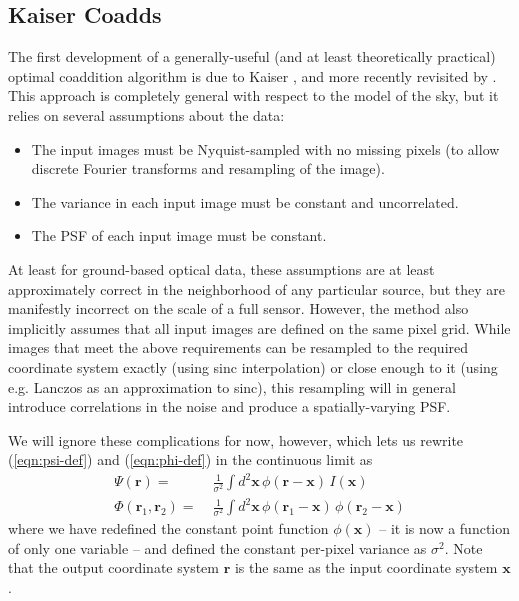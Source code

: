 \documentclass[10pt]{article}
\newcommand{\eqnref}[1]{(\ref{eqn:#1})}
\begin{document}
\subsection{Kaiser Coadds}
\label{sec:kaiser-coadds}

The first development of a generally-useful (and at least theoretically practical) optimal coaddition algorithm is due to Kaiser \citep{Kaiser2001}, and more recently revisited by \cite{2015arXiv151206879Z}.  This approach is completely general with respect to the model of the sky, but it relies on several assumptions about the data:
\begin{itemize}
\item The input images must be Nyquist-sampled with no missing pixels (to allow discrete Fourier transforms and resampling of the image).
\item The variance in each input image must be constant and uncorrelated.
\item The PSF of each input image must be constant.
\end{itemize}
At least for ground-based optical data, these assumptions are at least approximately correct in the neighborhood of any particular source, but they are manifestly incorrect on the scale of a full sensor.  However, the method also implicitly assumes that all input images are defined on the same pixel grid.  While images that meet the above requirements can be resampled to the required coordinate system exactly (using sinc interpolation) or close enough to it (using e.g. Lanczos as an approximation to sinc), this resampling will in general introduce correlations in the noise and produce a spatially-varying PSF.

We will ignore these complications for now, however, which lets us rewrite \eqnref{psi-def} and \eqnref{phi-def} in the continuous limit as
\begin{align}
\Psi(\bm{r}) =\;& \frac{1}{\sigma^2} \int\!d^2\bm{x}\,
    \phi(\bm{r}-\bm{x}) \, I(\bm{x})
    \\
\Phi(\bm{r}_1,\bm{r}_2) =\;&
    \frac{1}{\sigma^2} \int\!d^2\bm{x}\,
    \phi(\bm{r}_1-\bm{x}) \, \phi(\bm{r}_2-\bm{x})
\end{align}
where we have redefined the constant point function $\phi(\bm{x})$ -- it is now a function of only one variable -- and defined the constant per-pixel variance as $\sigma^2$.  Note that the output coordinate system $\bm{r}$ is the same as the input coordinate system $\bm{x}$.
\end{document}

